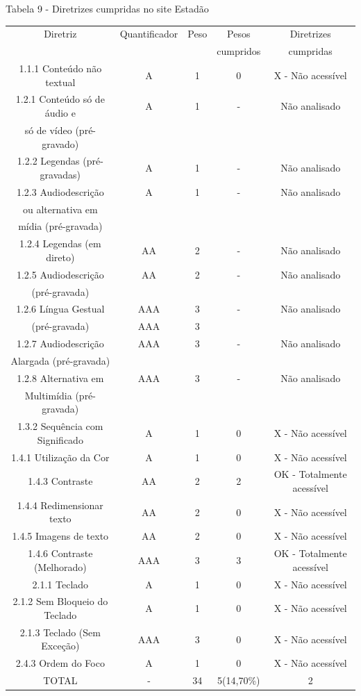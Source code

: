 \documentclass[a4paper]{article}
\begin{document}
\begin{titlepage}
Tabela 9 - Diretrizes cumpridas no site Estadão\\[-1cm]
\begin{center}
	\fontsize{8pt}{8pt}\selectfont	
	\begin{longtable}{|c|c|c|c|c|}
		\hline
		Diretriz & Quantificador & Peso & Pesos & Diretrizes\\
		& & & cumpridos & cumpridas\\
		\hline
		1.1.1 Conteúdo não textual & A & 1 & 0 & X - Não acessível\\
		\hline
		1.2.1 Conteúdo só de áudio e & A & 1 & - &  Não analisado\\
		só de vídeo (pré-gravado) & & & & \\
		\hline
		1.2.2 Legendas (pré-gravadas) & A & 1 & - &  Não analisado\\
		\hline
		1.2.3 Audiodescrição & A & 1 & - & Não analisado\\
		ou alternativa em & & & & \\
		mídia (pré-gravada) & & & & \\
		\hline
		1.2.4 Legendas (em direto) & AA & 2 & - & Não analisado\\
		\hline
		1.2.5 Audiodescrição & AA & 2 & - & Não analisado\\
		(pré-gravada) & & & & \\
		\hline
		1.2.6 Língua Gestual & AAA & 3 & - & Não analisado\\
		(pré-gravada) & AAA & 3 & & \\
		\hline
		1.2.7 Audiodescrição & AAA & 3 & - & Não analisado\\
		Alargada (pré-gravada) & & & & \\
		\hline
		1.2.8 Alternativa em & AAA & 3 & - & Não analisado\\
		Multimídia (pré-gravada) & & & & \\
		\hline
		1.3.2 Sequência com Significado & A & 1 & 0 & X - Não acessível \\
		\hline
		1.4.1 Utilização da Cor & A & 1 & 0 & X - Não acessível \\
		\hline
		1.4.3 Contraste & AA & 2 & 2 & OK - Totalmente acessível \\
		\hline
		1.4.4 Redimensionar texto & AA & 2 & 0 & X - Não acessível \\
		\hline
		1.4.5 Imagens de texto & AA & 2 & 0 & X - Não acessível\\
		\hline
		1.4.6 Contraste (Melhorado) & AAA & 3 & 3 & OK - Totalmente acessível \\
		\hline
		2.1.1 Teclado & A & 1 & 0 & X - Não acessível \\
		\hline
		2.1.2 Sem Bloqueio do Teclado & A & 1 & 0 & X - Não acessível \\
		\hline
		2.1.3 Teclado (Sem Exceção) & AAA & 3 & 0 & X - Não acessível \\
		\hline
		2.4.3 Ordem do Foco & A & 1 & 0 & X - Não acessível \\
		\hline
		TOTAL & - & 34 & 5(14,70\%) & 2 \\
		\hline
	\end{longtable}
\end{center}


\end{titlepage}
\end{document}

